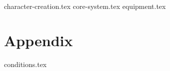 \documentclass[10pt,twoside,twocolumn,openany]{dndbook}
\begin{document}
{character-creation.tex}
{core-system.tex}
{equipment.tex}
\chapter{Appendix}\label{ch:appendix}
{conditions.tex}
\end{document}
